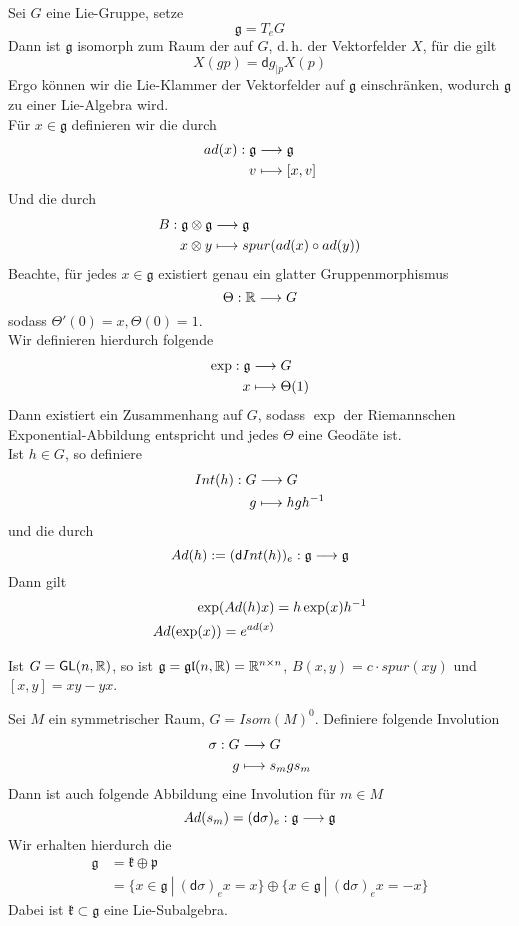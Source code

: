 \documentclass{book}
\renewcommand{\d}{\textsf{d}}
\newcommand{\g}{\mathfrak{g}}
\newcommand{\kf}{\mathfrak{k}}
\newcommand{\p}{\mathfrak{p}}
\newcommand{\GL}{\textsf{GL}(n,\R)}
\newcommand{\glf}{\mathfrak{gl}(n,\R)}
\begin{document}
\Bem{}
Sei $G$ eine Lie-Gruppe, setze
\[ \g = T_eG \]
Dann ist $\g$ isomorph zum Raum der  auf $G$, d.\,h. der Vektorfelder $X$, für die gilt
\[ X(gp) = \d g_{|p}X(p) \]
Ergo können wir die Lie-Klammer der Vektorfelder auf $\g$ einschränken, wodurch $\g$ zu einer Lie-Algebra wird.\\
Für $x\in\g$ definieren wir die  durch
\begin{align*}
ad(x) : \g & \Pfeil{} \g\\
v & \longmapsto [x,v]
\end{align*}
Und die  durch
\begin{align*}
B : \g \otimes \g &\Pfeil{} \g\\
x \otimes y & \longmapsto spur(ad(x) \circ ad(y))
\end{align*}
Beachte, für jedes $x \in \g$ existiert genau ein glatter Gruppenmorphismus
\[ \Theta : \mathbb{R} \overset{}{\longrightarrow} G \]
sodass $\Theta'(0) = x, \Theta(0) = 1$.\\
Wir definieren hierdurch folgende 
\begin{align*}
\exp : \g &\Pfeil{} G\\
x &\longmapsto \Theta(1)
\end{align*}
Dann existiert ein Zusammenhang auf $G$, sodass $\exp$ der Riemannschen Exponential-Abbildung entspricht und jedes $\Theta$ eine Geodäte ist.\\
Ist $h\in G$, so definiere
\begin{align*}
Int(h) :G& \overset{}{\longrightarrow} G\\
g & \longmapsto hgh^{-1}
\end{align*}
und die  durch
\[ Ad(h) := (\d Int(h))_{e} : \g \Pfeil{} \g \]
Dann gilt
\begin{align*}
\exp(Ad(h)x) &= h\exp(x)h^{-1}\\
Ad(\exp(x)) = e^{ad(x)}
\end{align*}

\Bem{}
Ist $G = \GL$, so ist $\g = \glf = \R^{n\times n}$, $B(x,y) = c \cdot spur(xy)$ und $[x,y] = xy -yx$. 

\Bem{}
Sei $M$ ein symmetrischer Raum, $G = Isom(M)^0$. Definiere folgende Involution
\begin{align*}
\sigma : G &\overset{}{\longrightarrow} G\\
g &\longmapsto s_mgs_m
\end{align*}
Dann ist auch folgende Abbildung eine Involution für $m \in M$
\[ Ad(s_m) = (\d\sigma)_{e} : \g \Pfeil{} \g \]
Wir erhalten hierdurch die 
\begin{align*}
\g &= \kf \oplus \p\\
&= \{ x \in \g ~|~ (\d\sigma)_{e}x = x \} \oplus \{ x \in \g ~|~ (\d\sigma)_{e}x = -x \}
\end{align*}
Dabei ist $\kf \subset \g$ eine Lie-Subalgebra.
\end{document}
